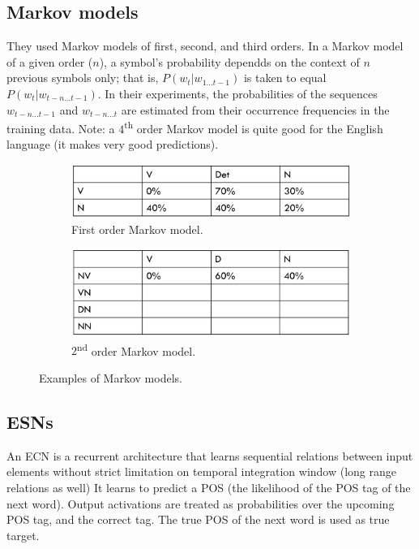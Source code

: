 \subsection{Markov models}
They used Markov models of first, second, and third orders. In a Markov model of a given order ($n$), a symbol's probability dependds on the context of $n$ previous symbols only; that is, $P(w_t \vert w_{1\dots t-1})$ is taken to equal $P(w_t \vert w_{t-n\dots t-1})$. In their experiments, the probabilities of the sequences $w_{t-n\dots t-1}$ and $w_{t-n\dots t}$ are estimated from their occurrence frequencies in the training data. Note: a $4$\textsuperscript{th} order Markov model is quite good for the English language (it makes very good predictions).

\begin{figure}[!ht]
    \centering
    \captionsetup{width=.8\linewidth}
    \begin{subfigure}{.49\textwidth}
        \centering
        \includegraphics[width=.9\linewidth]{images/markov.png}
        \caption{First order Markov model.}
    \end{subfigure}
    \begin{subfigure}{.49\textwidth}
        \centering
        \includegraphics[width=.9\linewidth]{images/markov_2.png}
        \caption{$2$\textsuperscript{nd} order Markov model.}
    \end{subfigure}
    \caption{Examples of Markov models.}
    \label{fig:markov}
\end{figure}

\subsection{ESNs}
An ECN is a recurrent architecture that learns sequential relations between input elements without strict limitation on temporal integration window (long range relations as well)
It learns to predict a POS (the likelihood of the POS tag of the next word). Output activations are treated as probabilities over the upcoming POS tag, and the correct tag. The true POS of the next word is used as true target.

